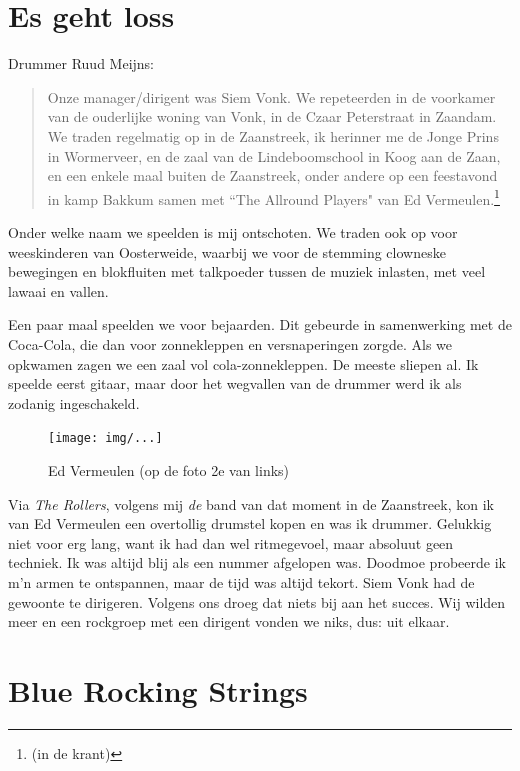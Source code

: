 \documentclass[12pt,twoside]{memoir}
\begin{document}
\chapter{Es geht loss} %
\label{cha:gehtloss}

Drummer Ruud Meijns: 

\begin{quote}
Onze manager/dirigent was Siem Vonk. We repeteerden in de voorkamer van de ouderlijke woning van Vonk, in de Czaar Peterstraat in Zaandam. We traden regelmatig op in de Zaanstreek, ik herinner me de Jonge Prins in Wormerveer, en de zaal van de Lindeboomschool in Koog aan de Zaan, en een enkele maal buiten de Zaanstreek, onder andere op een feestavond in kamp Bakkum samen met ``The Allround Players" van Ed Vermeulen.\footnote{(in de krant)}
\end{quote}

Onder welke naam we speelden is mij ontschoten. We traden ook op voor weeskinderen van Oosterweide, waarbij we voor de stemming clowneske bewegingen en blokfluiten met talkpoeder tussen de muziek inlasten, met veel lawaai en vallen. 

Een paar maal speelden we voor bejaarden. Dit gebeurde in samenwerking met de Coca-Cola, die dan voor zonnekleppen en versnaperingen zorgde. Als we opkwamen zagen we een zaal vol cola-zonnekleppen. De meeste sliepen al. Ik speelde eerst gitaar, maar door het wegvallen van de drummer werd ik als zodanig ingeschakeld. 

\begin{figure}[t]
\texttt{[image: img/...]}
\caption{Ed Vermeulen (op de foto 2e van links)}
\end{figure}

Via \emph{The Rollers}, volgens mij \emph{de} band van dat moment in de Zaanstreek, kon ik van Ed Vermeulen een overtollig drumstel kopen en was ik drummer. Gelukkig niet voor erg lang, want ik had dan wel ritmegevoel, maar absoluut geen techniek. Ik was altijd blij als een nummer afgelopen was. Doodmoe probeerde ik m'n armen te ontspannen, maar de tijd was altijd tekort. Siem Vonk had de gewoonte te dirigeren. Volgens ons droeg dat niets bij aan het succes. Wij wilden meer en een rockgroep met een dirigent vonden we niks, dus: uit elkaar. 

\chapter{Blue Rocking Strings} %
\label{cha:bluerocking}
\end{document}
